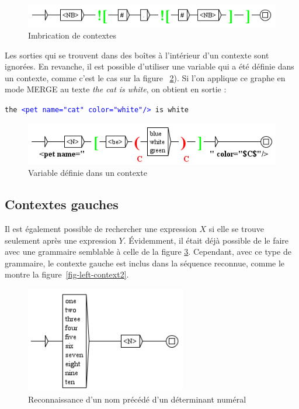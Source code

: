 \bigskip
\begin{figure}[!h]
\begin{center}
\includegraphics[width=12cm]{resources/img/fig6-16.png}
\caption{Imbrication de contextes\label{fig-context5}}
\end{center}
\end{figure}

\bigskip
\noindent Les sorties qui se trouvent dans des boîtes à l’intérieur d’un contexte sont ignorées.
En revanche, il est possible d’utiliser une variable qui a été définie dans un contexte, comme
c’est le cas sur la figure ~\ref{fig-context6}). Si l’on applique ce graphe en mode MERGE au texte
\textit{the cat is white}, on obtient en sortie :

\bigskip
\texttt{the \textcolor{blue}{<pet name="cat" color="white"/>} is white}

\bigskip

\begin{figure}[!h]
\begin{center}
\includegraphics[width=12.2cm]{resources/img/fig6-17.png}
\caption{Variable définie dans un contexte\label{fig-context6}}
\end{center}
\end{figure}

\subsection{Contextes gauches}
\index{\verb+$*+}
Il est également possible de rechercher une expression $X$ si elle se trouve seulement après une 
expression $Y$. Évidemment, il était déjà possible de le faire avec une grammaire semblable à celle
de la figure \ref{fig-left-context1}. Cependant, avec ce type de grammaire, le contexte gauche est
inclus dans la séquence reconnue, comme le montre la figure~\ref{fig-left-context2}.

\begin{figure}[!ht]
\begin{center}
\includegraphics[width=7cm]{resources/img/fig6-17a.png}
\caption{Reconnaissance d'un nom précédé d'un déterminant numéral\label{fig-left-context1}}
\end{center}
\end{figure}

